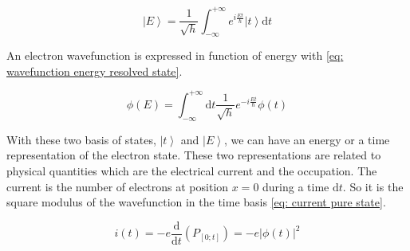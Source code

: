 \begin{equation}
\left|E\right> = \frac{1}{\sqrt{h}}\int_{-\infty}^{+\infty}  e^{i\frac{Et}{\hbar}}\left|t\right>\mathrm{d}t \label{eq: energy resolved state}
\end{equation}

An electron wavefunction is expressed in function of energy with \eqref{eq: wavefunction energy resolved state}. 

\begin{equation}
\phi\left(E\right) = \int_{-\infty}^{+\infty} \mathrm{d}t \frac{1}{\sqrt{h}}e^{-i\frac{Et}{\hbar}}\phi\left(t\right) \label{eq: wavefunction energy resolved state}
\end{equation}

With these two basis of states, $\left|t\right>$ and $\left|E\right>$, we can have an energy or a time representation of the electron state.
These two representations are related to physical quantities which are the electrical current and the occupation.
The current is the number of electrons at position $x=0$ during a time $\mathrm{d}t$.
So it is the square modulus of the wavefunction in the time basis \eqref{eq: current pure state}.

\begin{equation}
i\left(t\right) = -e \frac{\mathrm{d}}{\mathrm{d}t}\left(P_{\left[0;t\right]}\right) = -e|\phi\left(t\right)|^{2} \label{eq: current pure state}
\end{equation}

